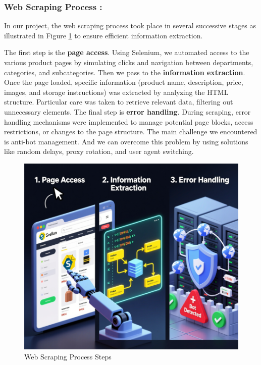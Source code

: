 \subsubsection{Web Scraping Process :}

\par In our project, the web scraping process took place in several successive stages as illustrated in Figure \ref{fig:web_scraping_steps} to ensure
efficient information extraction.

\par The first step is the \textbf{page access}. Using Selenium, we automated access
to the various product pages by simulating clicks and navigation between
departments, categories, and subcategories. Then we pass to the \textbf{information extraction}. Once the page loaded, specific information (product name, description, price, images, and storage
instructions) was extracted by analyzing the HTML structure. Particular care was taken to retrieve relevant data, filtering out unnecessary
elements. The final step is \textbf{error handling}. During scraping, error handling mechanisms were implemented to manage potential page blocks, access restrictions, or changes to the page structure. The main challenge we
encountered is anti-bot management. And we can overcome this problem
by using solutions like random delays, proxy rotation, and user agent
switching.

\begin{center}
\begin{figure}[H]
\centering
\includegraphics[scale=0.66]{images/web_scraping_steps.png}
\caption{Web Scraping Process Steps} 
\label{fig:web_scraping_steps}
\end{figure}
\end{center}



